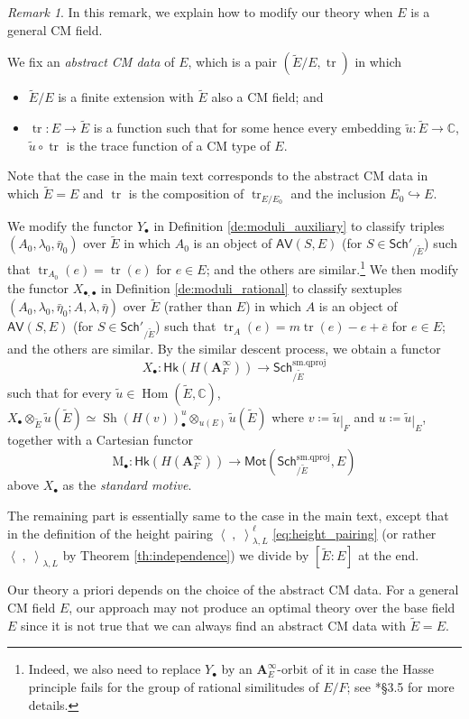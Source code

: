 \documentclass[12pt]{amsart}
\numberwithin{equation}{section}
\theoremstyle{plain}
\theoremstyle{definition}
\theoremstyle{remark}
\newtheorem{remark}[proposition]{Remark}
\renewcommand{\b}[1]{\mathbf{#1}}
\renewcommand{\d}[1]{\mathbb{#1}}
\renewcommand{\r}[1]{\mathrm{#1}}
\renewcommand{\sf}[1]{\mathsf{#1}}
\renewcommand{\(}{\left(}
\renewcommand{\)}{\right)}
\newcommand{\res}{\mathbin{|}}
\newcommand{\ol}[1]{\overline{#1}{}}
\newcommand{\bA}{\b A}
\newcommand{\dC}{\d C}
\newcommand{\rM}{\r M}
\newcommand{\llangle}{\left\langle}
\newcommand{\rrangle}{\right\rangle}
\newcommand{\smq}{\r{sm.qproj}}
\newcommand{\Sch}{\sf{Sch}}
\newcommand{\AV}{\sf{AV}}
\newcommand{\Hk}{\sf{Hk}}
\newcommand{\Mot}{\sf{Mot}}
\DeclareMathOperator{\Hom}{Hom}
\DeclareMathOperator{\Sh}{Sh}
\DeclareMathOperator{\tr}{tr}
\begin{document}
\begin{remark}\label{re:general_cm}
In this remark, we explain how to modify our theory when $E$ is a general CM field.

We fix an \emph{abstract CM data} of $E$, which is a pair $(\widetilde{E}/E,\tr)$ in which
\begin{itemize}
  \item $\widetilde{E}/E$ is a finite extension with $\widetilde{E}$ also a CM field; and

  \item $\tr\colon E\to\widetilde{E}$ is a function such that for some hence every embedding $\tilde{u}\colon\widetilde{E}\to\dC$, $\tilde{u}\circ\tr$ is the trace function of a CM type of $E$.
\end{itemize}
Note that the case in the main text corresponds to the abstract CM data in which $\widetilde{E}=E$ and $\tr$ is the composition of $\tr_{E/E_0}$ and the inclusion $E_0\hookrightarrow E$.

We modify the functor $Y_\bullet$ in Definition \ref{de:moduli_auxiliary} to classify triples $(A_0,\lambda_0,\bar\eta_0)$ over $\widetilde{E}$ in which $A_0$ is an object of $\AV(S,E)$ (for $S\in\Sch'_{/\widetilde{E}}$) such that $\tr_{A_0}(e)=\tr(e)$ for $e\in E$; and the others are similar.\footnote{Indeed, we also need to replace $Y_\bullet$ by an $\bA_E^\infty$-orbit of it in case the Hasse principle fails for the group of rational similitudes of $E/F$; see \cite{LTXZZ}*{\S3.5} for more details.} We then modify the functor $X_{\bullet,\bullet}$ in Definition \ref{de:moduli_rational} to classify sextuples $(A_0,\lambda_0,\bar\eta_0;A,\lambda,\bar\eta)$ over $\widetilde{E}$ (rather than $E$) in which $A$ is an object of $\AV(S,E)$ (for $S\in\Sch'_{/\widetilde{E}}$) such that $\tr_A(e)=m\tr(e)-e+\ol{e}$ for $e\in E$; and the others are similar. By the similar descent process, we obtain a functor
\[
X_\bullet\colon\Hk(H(\bA_F^\infty))\to\Sch^\smq_{/\widetilde{E}}
\]
such that for every $\tilde{u}\in\Hom(\widetilde{E},\dC)$, $X_\bullet\otimes_{\widetilde{E}}\tilde{u}(\widetilde{E})\simeq \Sh(H(v))_\bullet^u\otimes_{u(E)}\tilde{u}(\widetilde{E})$ where $v\coloneqq\tilde{u}\res_F$ and $u\coloneqq\tilde{u}\res_E$, together with a Cartesian functor
\[
\rM_\bullet\colon\Hk(H(\bA_F^\infty))\to\Mot(\Sch^\smq_{/\widetilde{E}},E)
\]
above $X_\bullet$ as the \emph{standard motive}.

The remaining part is essentially same to the case in the main text, except that in the definition of the height pairing $\llangle\;,\;\rrangle_{\lambda,L}^{\ell}$ \eqref{eq:height_pairing} (or rather $\llangle\;,\;\rrangle_{\lambda,L}$ by Theorem \ref{th:independence}) we divide by $[\widetilde{E}:E]$ at the end.

Our theory a priori depends on the choice of the abstract CM data. For a general CM field $E$, our approach may not produce an optimal theory over the base field $E$ since it is not true that we can always find an abstract CM data with $\widetilde{E}=E$.
\end{remark}
\end{document}
